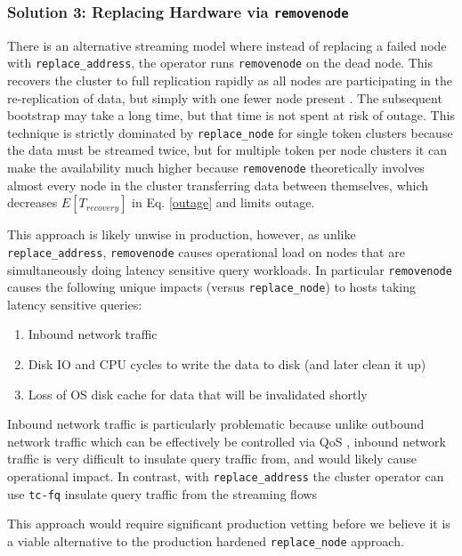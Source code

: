 \documentclass{article}
\begin{document}
\subsubsection{Solution 3: Replacing Hardware via \texttt{removenode}}
\label{sec:replacing}
There is an alternative streaming model where instead of replacing a
failed node with \texttt{replace\_address}, the operator runs
\texttt{removenode} on the dead node. This recovers the cluster to
full replication rapidly as all nodes are participating in the
re-replication of data, but simply with one fewer node present
\cite{removenode}. The subsequent bootstrap may take a long time,
but that time is not spent at risk of outage. This technique is strictly
dominated by \texttt{replace\_node} for single token clusters because
the data must be streamed twice, but for multiple token per node clusters
it can make the availability much higher because \texttt{removenode}
theoretically involves almost every node in the cluster transferring
data between themselves, which decreases ${E[T_{recovery}]}$ in
Eq. \ref{outage} and limits outage.

This approach is likely unwise in production, however, as unlike
\texttt{replace\_address}, \texttt{removenode} causes operational load
on nodes that are simultaneously doing latency sensitive query workloads.
In particular \texttt{removenode} causes the following unique impacts
(versus \texttt{replace\_node}) to hosts taking latency sensitive queries:
\begin{enumerate}
\item{Inbound network traffic}
\item{Disk IO and CPU cycles to write the data to disk (and later clean
it up)}
\item{Loss of OS disk cache for data that will be invalidated shortly}
\end{enumerate}

Inbound network traffic is particularly problematic because unlike
outbound network traffic which can be effectively be controlled
via QoS \cite{qos}, inbound network traffic is very difficult to insulate
query traffic from, and would likely cause operational impact. In contrast,
with \texttt{replace\_address} the cluster operator can use \texttt{tc-fq}
insulate query traffic from the streaming flows \cite{tc-fq}

This approach would require significant production vetting before we
believe it is a viable alternative to the production hardened
\texttt{replace\_node} approach.
\end{document}
